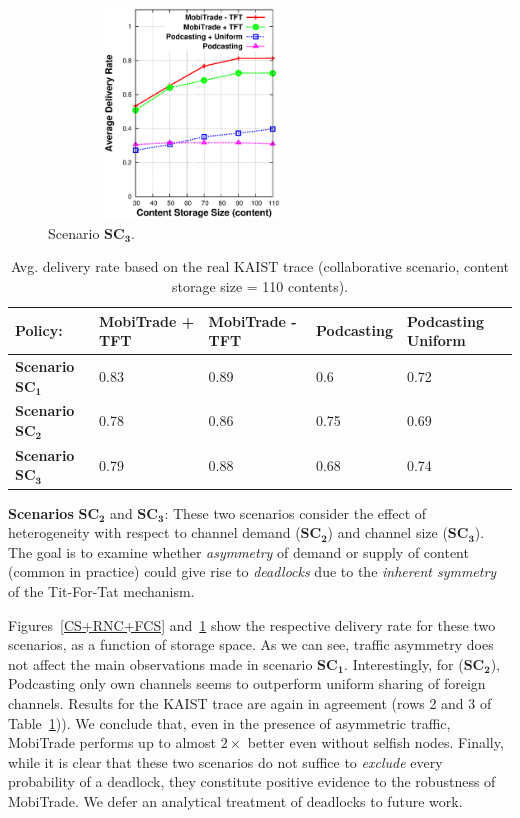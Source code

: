\begin{figure}[!h]
  \begin{center}
    \includegraphics[width=3in,height=2.2in]{Chapitre5/fig7.eps}
  \end{center}
  \caption{Scenario $\mathbf{SC_3}$.}
  \label{CS+FNC+RCS}
\end{figure}


\begin{table}[!h]
\vspace{-0.1in}
\caption{Avg. delivery rate based on the real KAIST trace (collaborative scenario, content storage size = 110 contents).}
\centering
\label{table:kaist:col}
\footnotesize
\begin{tabular}{|p{3cm}|p{2cm}|p{2cm}|p{2cm}|p{2cm}|}
\hline
\bfseries Policy:& \bfseries MobiTrade + TFT & \bfseries MobiTrade - TFT & \bfseries Podcasting & \bfseries Podcasting Uniform\\
\hline
\bfseries Scenario $\mathbf{SC_{1}}$ & 0.83 & 0.89&0.6 &0.72\\
\hline
\bfseries Scenario $\mathbf{SC_{2}}$ & 0.78 &0.86 &0.75 &0.69\\
\hline
\bfseries Scenario $\mathbf{SC_{3}}$ &0.79  &0.88 &0.68 &0.74\\
\hline
\end{tabular}
\end{table}

\noindent \textbf{Scenarios} $\mathbf{SC_{2}}$ and $\mathbf{SC_{3}}$: These two scenarios consider the effect of heterogeneity with respect to channel demand ($\mathbf{SC_{2}}$) and channel size ($\mathbf{SC_{3}}$). The goal is to examine whether \emph{asymmetry} of demand or supply of content (common in practice) could give rise to \emph{deadlocks} due to the \emph{inherent symmetry} of the Tit-For-Tat mechanism.

Figures~\ref{CS+RNC+FCS} and~\ref{CS+FNC+RCS} show the respective delivery rate for these two scenarios, as a function of storage space. As we can see, traffic asymmetry does not affect the main observations made in scenario $\mathbf{SC_{1}}$. Interestingly,  for ($\mathbf{SC_{2}}$), Podcasting only own channels seems to outperform uniform sharing of foreign channels. Results for the KAIST trace are again in agreement (rows 2 and 3 of Table~\ref{table:kaist:col})). We conclude that, even in the presence of asymmetric traffic, MobiTrade performs up to almost $2\times$ better even without selfish nodes. Finally, while it is clear that these two scenarios do not suffice to \emph{exclude} every probability of a deadlock, they constitute positive evidence to the robustness of MobiTrade. We defer an analytical treatment of deadlocks to future work.


